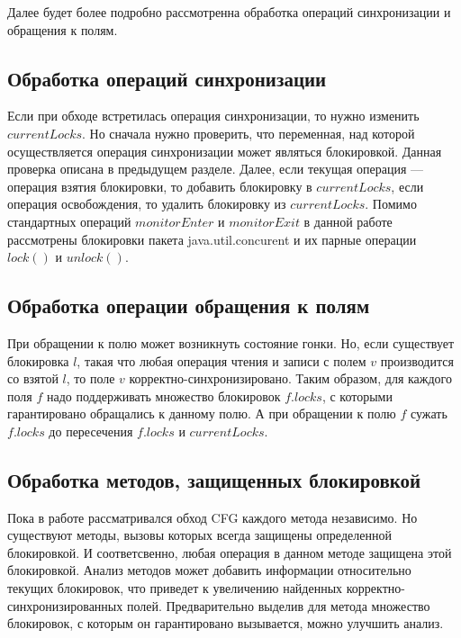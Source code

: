 \FloatBarrier

Далее будет более подробно рассмотренна обработка операций синхронизации и обращения к полям.

\subsection{Обработка операций синхронизации}
Если при обходе встретилась операция синхронизации, то нужно изменить $currentLocks$. Но сначала нужно проверить, что переменная, над которой осуществляется операция синхронизации может являться блокировкой. Данная проверка описана в предыдущем разделе. Далее, если текущая операция --- операция взятия блокировки, то добавить блокировку в $currentLocks$, 
если операция освобождения, то удалить блокировку из $currentLocks$. Помимо стандартных операций $monitorEnter$ и $monitorExit$ в данной работе рассмотрены блокировки пакета java.util.concurent и их парные операции $lock()$ и $unlock()$.

\subsection{Обработка операции обращения к полям}
При обращении к полю может возникнуть состояние гонки. Но, если существует блокировка $l$, такая что любая операция чтения  и записи с полем $v$ производится со взятой $l$, то поле $v$ корректно-синхронизировано. Таким образом, для каждого поля $f$ надо поддерживать множество блокировок $f.locks$, с которыми гарантировано обращались к данному полю. А при обращении к полю $f$ сужать $f.locks$ до пересечения $f.locks$ и $currentLocks$. 


\subsection{Обработка методов, защищенных блокировкой}
Пока в работе рассматривался обход CFG каждого метода независимо. Но существуют методы, вызовы которых  всегда защищены определенной блокировкой. И соответсвенно, любая операция в данном методе защищена этой блокировкой. Анализ методов может добавить информации относительно текущих блокировок, что приведет к увеличению найденных корректно-синхронизированных полей. Предварительно выделив для метода множество блокировок, с которым он гарантировано вызывается, можно улучшить анализ.




